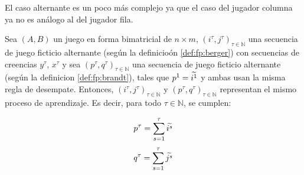 El caso alternante es un poco más complejo ya que el caso del jugador columna ya no es análogo al del jugador fila.

\begin{lemma}
    Sea $(A, B)$ un juego en forma bimatricial de $n \times m$, $(i^\tau, j^\tau)_{\tau \in \mathbb{N}}$ una secuencia de juego ficticio alternante (según la definicioón \ref{def:fp:berger}) con secuencias de creencias $y^\tau$, $x^\tau$ y sea $(p^\tau, q^\tau)_{\tau \in \mathbb{N}}$ una secuencia de juego ficticio alternante (según la definicion \ref{def:fp:brandt}), tales que $p^1 = \widetilde{i^1}$ y ambas usan la misma regla de desempate. Entonces, $(i^\tau, j^\tau)_{\tau \in \mathbb{N}}$ y $(p^\tau, q^\tau)_{\tau \in \mathbb{N}}$ representan el mismo proceso de aprendizaje. Es decir, para todo $\tau \in \mathbb{N}$, se cumplen:

    \[ p^{\tau} = \sum_{s=1}^\tau{\widetilde{i^s}} \]
    \[ q^{\tau} = \sum_{s=1}^\tau{\widetilde{j^s}} \]

\end{lemma}
